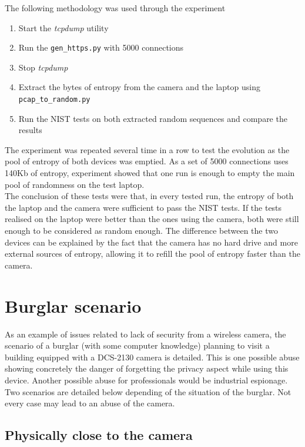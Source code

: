 The following methodology was used through the experiment

\begin{enumerate}
\item Start the \emph{tcpdump} utility
\item Run the \texttt{gen\_https.py} with 5000 connections
\item Stop \emph{tcpdump}
\item Extract the bytes of entropy from the camera and the laptop using \texttt{pcap\_to\_random.py}
\item Run the NIST tests on both extracted random sequences and compare the results
\end{enumerate}

The experiment was repeated several time in a row to test the evolution as the pool of entropy of both devices was emptied.
As a set of 5000 connections uses 140Kb of entropy, experiment showed that one run is enough to empty the main pool of randomness on the test laptop.\\

The conclusion of these tests were that, in every tested run, the entropy of both the laptop and the camera were sufficient to pass the NIST tests.
If the tests realised on the laptop were better than the ones using the camera, both were still enough to be considered as random enough.
The difference between the two devices can be explained by the fact that the camera has no hard drive and more external sources of entropy, allowing it to refill the pool of entropy faster than the camera.

\section{Burglar scenario}
\label{sec:dcs-burglar}

As an example of issues related to lack of security from a wireless camera, the scenario of a burglar (with some computer knowledge) planning to visit a building equipped with a DCS-2130 camera is detailed.
This is one possible abuse showing concretely the danger of forgetting the privacy aspect while using this device.
Another possible abuse for professionals would be industrial espionage.
Two scenarios are detailed below depending of the situation of the burglar.
Not every case may lead to an abuse of the camera.

\subsection{Physically close to the camera}

